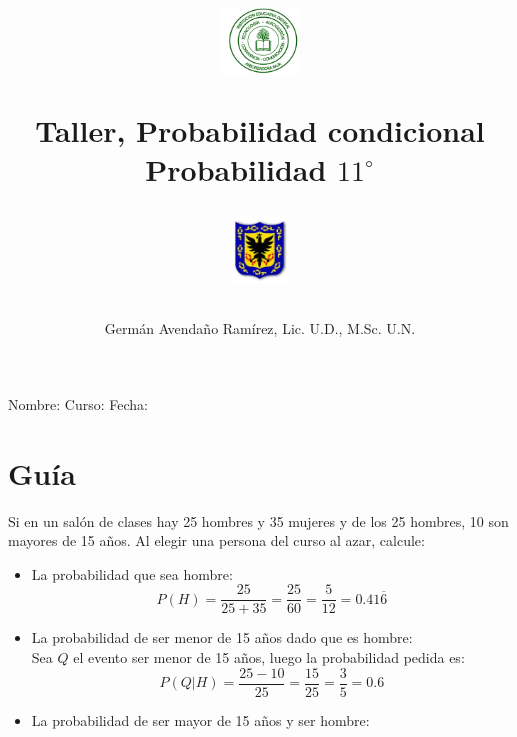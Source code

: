 \documentclass[10pt,twoside]{article}
\author{Germ\'an Avenda\~no Ram\'irez, Lic. U.D., M.Sc. U.N.}
\title{\begin{minipage}{.2\textwidth}
\includegraphics[height=1.75cm]{Images/logo-colegio.png}\end{minipage}
\begin{minipage}{.55\textwidth}
\begin{center}
Taller, Probabilidad condicional  \\
Probabilidad $11^{\circ}$
\end{center}
\end{minipage}\hfill
\begin{minipage}{.2\textwidth}
\includegraphics[height=1.75cm]{Images/logo-sed.png} 
\end{minipage}}
\date{}
\begin{document}
\maketitle
Nombre: \hrulefill Curso: \underline{\hspace*{44pt}} Fecha: \underline{\hspace*{2.5cm}}
\section*{Gu\'{i}a}
Si en un sal\'{o}n de clases  hay 25 hombres y 35 mujeres y de los 25 hombres, 10 son mayores de 15 años. Al elegir una persona del curso al azar, calcule:
\begin{itemize}
\item La probabilidad que sea hombre:
\[P(H)=\dfrac{25}{25+35}=\dfrac{25}{60}=\dfrac{5}{12}=0.41\overline{6}\]
\item La probabilidad de ser menor de 15 años dado que es hombre:\\

Sea $Q$ el evento ser menor de 15 años, luego la probabilidad pedida es:
\[P(Q|H)=\dfrac{25-10}{25}=\dfrac{15}{25}=\dfrac{3}{5}=0.6\]
\item La probabilidad de ser mayor de 15 años y ser hombre:

\end{itemize}
\end{document}
